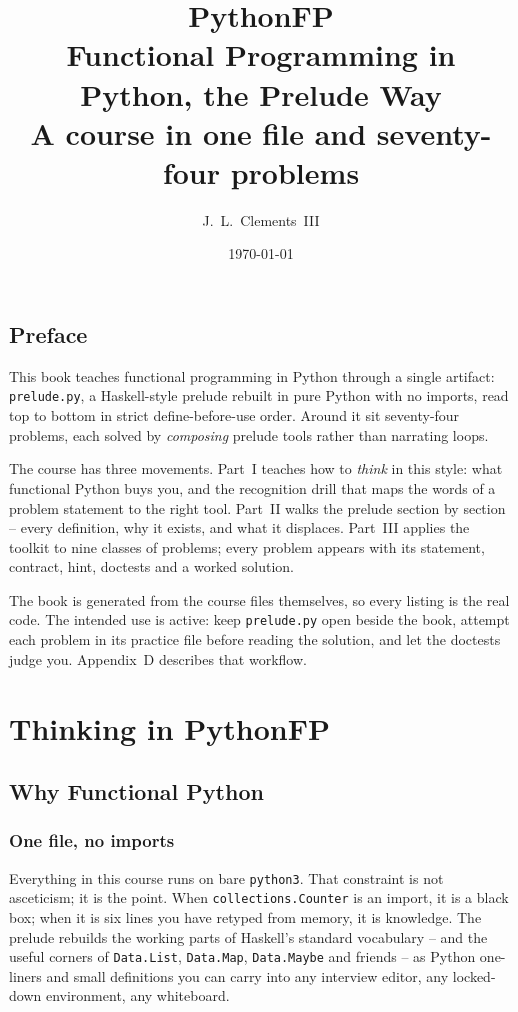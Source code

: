 \documentclass[11pt,letterpaper]{book}
\title{\Huge\bfseries PythonFP\\[6pt]
  \Large Functional Programming in Python, the Prelude Way\\[16pt]
  \normalsize A course in one file and seventy-four problems}
\author{J.~L.~Clements~III}
\date{\today}
\begin{document}
\frontmatter
\maketitle

\chapter{Preface}
This book teaches functional programming in Python through a single artifact:
\texttt{prelude.py}, a Haskell-style prelude rebuilt in pure Python with no
imports, read top to bottom in strict define-before-use order. Around it sit
seventy-four problems, each solved by \emph{composing} prelude tools rather
than narrating loops.

The course has three movements. Part~I teaches how to \emph{think} in this
style: what functional Python buys you, and the recognition drill that maps the
words of a problem statement to the right tool. Part~II walks the prelude
section by section -- every definition, why it exists, and what it displaces.
Part~III applies the toolkit to nine classes of problems; every problem appears
with its statement, contract, hint, doctests and a worked solution.

The book is generated from the course files themselves, so every listing is the
real code. The intended use is active: keep \texttt{prelude.py} open beside the
book, attempt each problem in its practice file before reading the solution,
and let the doctests judge you. Appendix~D describes that workflow.

\tableofcontents
\mainmatter
\part{Thinking in PythonFP}
\chapter{Why Functional Python}
\section{One file, no imports}
Everything in this course runs on bare \texttt{python3}. That constraint is not
asceticism; it is the point. When \texttt{collections.Counter} is an import,
it is a black box; when it is six lines you have retyped from memory, it is
knowledge. The prelude rebuilds the working parts of Haskell's standard
vocabulary -- and the useful corners of \texttt{Data.List}, \texttt{Data.Map},
\texttt{Data.Maybe} and friends -- as Python one-liners and small definitions
you can carry into any interview editor, any locked-down environment, any
whiteboard.
\end{document}
